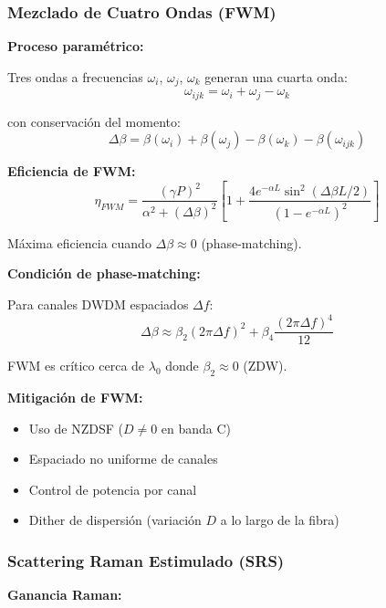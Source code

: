 \documentclass[11pt,a4paper]{article}
\begin{document}
\subsubsection{Mezclado de Cuatro Ondas (FWM)}

\textbf{Proceso paramétrico:}

Tres ondas a frecuencias $\omega_i$, $\omega_j$, $\omega_k$ generan una cuarta onda:
\begin{equation}
    \omega_{ijk} = \omega_i + \omega_j - \omega_k
\end{equation}

con conservación del momento:
\begin{equation}
    \Delta\beta = \beta(\omega_i) + \beta(\omega_j) - \beta(\omega_k) - \beta(\omega_{ijk})
\end{equation}

\textbf{Eficiencia de FWM:}
\begin{equation}
    \eta_{FWM} = \frac{(\gamma P)^2}{\alpha^2 + (\Delta\beta)^2}\left[1 + \frac{4e^{-\alpha L}\sin^2(\Delta\beta L/2)}{(1 - e^{-\alpha L})^2}\right]
\end{equation}

Máxima eficiencia cuando $\Delta\beta \approx 0$ (phase-matching).

\textbf{Condición de phase-matching:}

Para canales DWDM espaciados $\Delta f$:
\begin{equation}
    \Delta\beta \approx \beta_2(2\pi\Delta f)^2 + \beta_4\frac{(2\pi\Delta f)^4}{12}
\end{equation}

FWM es crítico cerca de $\lambda_0$ donde $\beta_2 \approx 0$ (ZDW).

\textbf{Mitigación de FWM:}
\begin{itemize}
    \item Uso de NZDSF ($D \neq 0$ en banda C)
    \item Espaciado no uniforme de canales
    \item Control de potencia por canal
    \item Dither de dispersión (variación $D$ a lo largo de la fibra)
\end{itemize}

\subsubsection{Scattering Raman Estimulado (SRS)}

\textbf{Ganancia Raman:}
\end{document}
